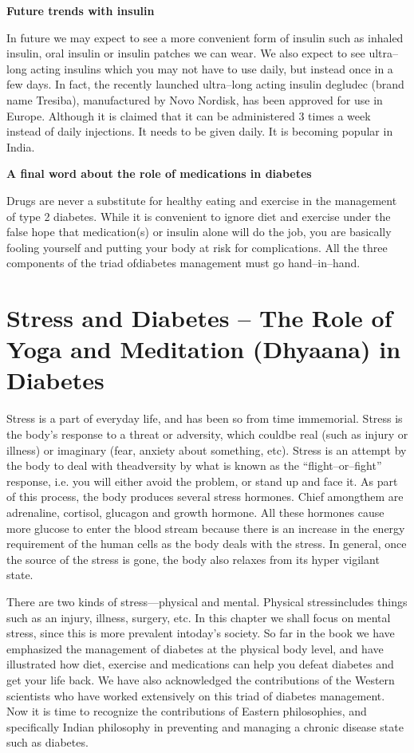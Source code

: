 \noindent\textbf{Future trends with insulin}

In future we may expect to see a more convenient form of insulin such as inhaled insulin, oral insulin or insulin patches we can wear. We also expect to see ultra–long acting insulins which you may not have to use daily, but instead once in a few days. In fact, the recently launched ultra–long acting insulin degludec (brand name Tresiba), manufactu\-red by Novo Nordisk, has been approved for use in Europe. Although it is claimed that it can be administered 3 times a week instead of daily injections. It needs to be given daily. It is becoming popular in India.

\noindent\textbf{A final word about the role of medications in diabetes}

Drugs are never a substitute for healthy eating and exercise in the management of type 2 diabetes. While it is convenient to ignore diet and exercise under the false hope that medication(s) or insulin alone will do the job, you are basically fooling yourself and putting your body at risk for complications. All the three components of the triad of\break diabetes management must go hand–in–hand.

\newpage

\chapter{Stress and Diabetes – The Role of Yoga and Meditation (Dhyaana) in Diabetes}\label{chap27}

Stress is a part of everyday life, and has been so from time immemorial. Stress is the body’s response to a threat or adversity, which could\break be real (such as injury or illness) or imaginary (fear, anxiety about something, etc). Stress is an attempt by the body to deal with the\break adversity by what is known as the “flight–or–fight” response, i.e. you will either avoid the problem, or stand up and face it. As part of this process, the body produces several stress hormones. Chief among\break them are adrenaline, cortisol, glucagon and growth hormone. All these hormones cause more glucose to enter the blood stream because there is an increase in the energy requirement of the human cells as the body deals with the stress. In general, once the source of the stress is gone, the body also relaxes from its hyper vigilant state.

There are two kinds of stress—physical and mental. Physical stress\break includes things such as an injury, illness, surgery, etc. In this chapter we shall focus on mental stress, since this is more prevalent in\break today’s society. So far in the book we have emphasized the management of diabetes at the physical body level, and have illustrated how diet, exercise and medications can help you defeat diabetes and get your life back. We have also acknowledged the contributions of the Western scientists who have worked extensively on this triad of diabetes management. Now it is time to recognize the contributions of Eastern philosophies, and specifically Indian philosophy in preventing and managing a chronic disease state such as diabetes.

